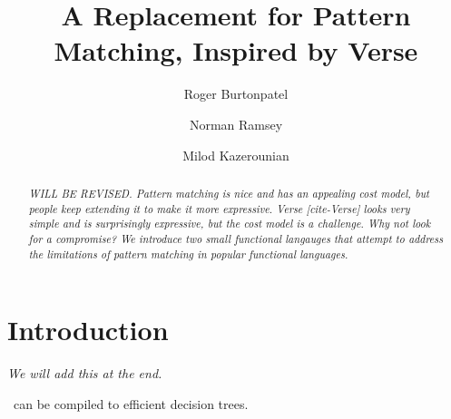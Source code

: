 \documentclass[manuscript,screen,review, 12pt]{acmart}
\begin{document}
\title{A Replacement for Pattern Matching, Inspired by Verse}

\author{Roger Burtonpatel}

\author{Norman Ramsey}

\author{Milod Kazerounian}

\renewcommand{\shortauthors}{Burtonpatel et al.}

\begin{abstract}
    \it{WILL BE REVISED.}
  Pattern matching is nice and has an appealing cost model, but people keep
  extending it to make it more expressive. Verse [cite-Verse] looks very simple
  and is surprisingly expressive, but the cost model is a challenge. Why not
  look for a compromise? We introduce two small functional langauges that
  attempt to address the limitations of pattern matching in popular functional
  languages.
  \end{abstract}

\maketitle

\section{Introduction}
\it{We will add this at the end.}

\VMinus\ can be compiled to efficient decision trees. 
\end{document}
